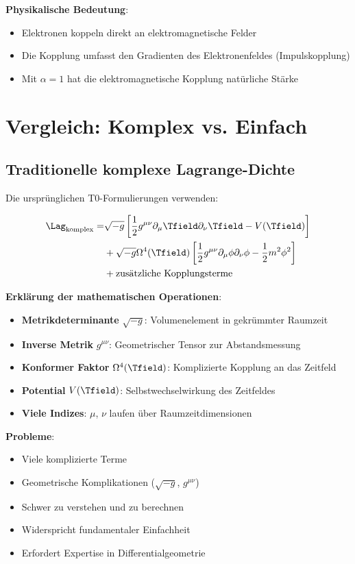 	\textbf{Physikalische Bedeutung}:
	\begin{itemize}
		\item Elektronen koppeln direkt an elektromagnetische Felder
		\item Die Kopplung umfasst den Gradienten des Elektronenfeldes (Impulskopplung)
		\item Mit $\alpha = 1$ hat die elektromagnetische Kopplung natürliche Stärke
	\end{itemize}
	
	\section{Vergleich: Komplex vs. Einfach}
	
	\subsection{Traditionelle komplexe Lagrange-Dichte}
	
	Die ursprünglichen T0-Formulierungen verwenden:
	
	\begin{align}
		\Lag_{\text{komplex}} = &\sqrt{-g} \left[\frac{1}{2} g^{\mu\nu} \partial_\mu \Tfield \partial_\nu \Tfield - V(\Tfield)\right] \\
		&+ \sqrt{-g} \Omega^4(\Tfield) \left[\frac{1}{2} g^{\mu\nu} \partial_\mu \phi \partial_\nu \phi - \frac{1}{2} m^2 \phi^2\right] \\
		&+ \text{zusätzliche Kopplungsterme}
	\end{align}
	
	\textbf{Erklärung der mathematischen Operationen}:
	\begin{itemize}
		\item \textbf{Metrikdeterminante} $\sqrt{-g}$: Volumenelement in gekrümmter Raumzeit
		\item \textbf{Inverse Metrik} $g^{\mu\nu}$: Geometrischer Tensor zur Abstandsmessung
		\item \textbf{Konformer Faktor} $\Omega^4(\Tfield)$: Komplizierte Kopplung an das Zeitfeld
		\item \textbf{Potential} $V(\Tfield)$: Selbstwechselwirkung des Zeitfeldes
		\item \textbf{Viele Indizes}: $\mu$, $\nu$ laufen über Raumzeitdimensionen
	\end{itemize}
	
	\textbf{Probleme}:
	\begin{itemize}
		\item Viele komplizierte Terme
		\item Geometrische Komplikationen ($\sqrt{-g}$, $g^{\mu\nu}$)
		\item Schwer zu verstehen und zu berechnen
		\item Widerspricht fundamentaler Einfachheit
		\item Erfordert Expertise in Differentialgeometrie
	\end{itemize}
	
